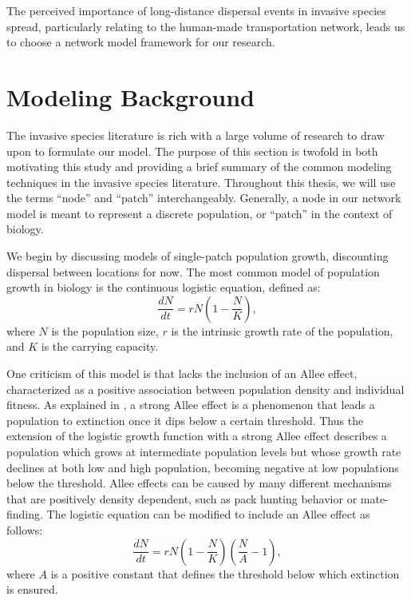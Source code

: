 \documentclass[12pt, openany]{book}
\theoremstyle{definition}
\theoremstyle{remark}
\numberwithin{equation}{chapter}
\numberwithin{figure}{chapter}
\begin{document}
The perceived importance of long-distance dispersal events in invasive species spread, particularly relating to the human-made transportation network, leads us to choose a network model framework for our research.

\section{Modeling Background}

The invasive species literature is rich with a large volume of research to draw upon to formulate our model. The purpose of this section is twofold in both motivating this study and providing a brief summary of the common modeling techniques in the invasive species literature. Throughout this thesis, we will use the terms ``node'' and ``patch'' interchangeably. Generally, a node in our network model is meant to represent a discrete population, or ``patch'' in the context of biology.

We begin by discussing models of single-patch population growth, discounting dispersal between locations for now. The most common model of population growth in biology is the continuous logistic equation, defined as:
\begin{equation}\label{logisticode}
\frac{dN}{dt} = rN\left(1 - \frac{N}{K}\right),
\end{equation}
where $N$ is the population size, $r$ is the intrinsic growth rate of the population, and $K$ is the carrying capacity.

One criticism of this model is that lacks the inclusion of an Allee effect, characterized as a positive association between population density and individual fitness. As explained in \cite{korolev2014turning}, a strong Allee effect is a phenomenon that leads a population to extinction once it dips below a certain threshold. Thus the extension of the logistic growth function with a strong Allee effect describes a population which grows at intermediate population levels but whose growth rate declines at both low and high population, becoming negative at low populations below the threshold. Allee effects can be caused by many different mechanisms that are positively density dependent, such as pack hunting behavior or mate-finding. The logistic equation can be modified to include an Allee effect as follows:
\begin{equation}\label{alleeode}
\frac{dN}{dt} = rN\left(1 - \frac{N}{K}\right)\left(\frac{N}{A} - 1\right),
\end{equation}
where $A$ is a positive constant that defines the threshold below which extinction is ensured. 
\end{document}
